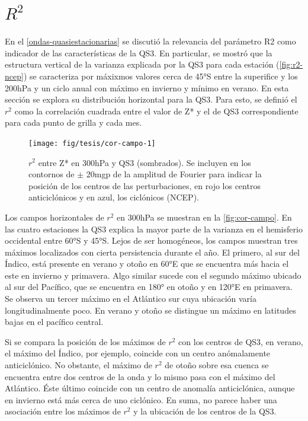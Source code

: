 \documentclass[spanish,a4paper,12pt,oneside]{book}
\begin{document}
\section{\texorpdfstring{\(R^2\)}{R\^{}2}}\label{r2}

En el \autoref{ondas-quasiestacionarias} se discutió la relevancia del
parámetro R2 como indicador de las características de la QS3. En
particular, se mostró que la estructura vertical de la varianza
explicada por la QS3 para cada estación (\autoref{fig:r2-ncep}) se
caracteriza por máxixmos valores cerca de 45°S entre la superifice y los
200hPa y un ciclo anual con máximo en invierno y mínimo en verano. En
esta sección se explora su distribución horizontal para la QS3. Para
esto, se definió el \(r^2\) como la correlación cuadrada entre el valor
de Z* y el de QS3 correspondiente para cada punto de grilla y cada mes.

\begin{figure}
\texttt{[image: fig/tesis/cor-campo-1]} \caption{$r^2$ entre Z* en 300hPa y QS3 (sombrados). Se incluyen en  los contornos de $\pm$ 20mgp de la amplitud de Fourier para indicar la posición de los centros de las perturbaciones, en rojo los centros anticiclónicos y en azul, los ciclónicos (NCEP).}\label{fig:cor-campo}
\end{figure}

Los campos horizontales de \(r^2\) en 300hPa se muestran en la
\autoref{fig:cor-campo}. En las cuatro estaciones la QS3 explica la
mayor parte de la varianza en el hemisferio occidental entre 60°S y
45°S. Lejos de ser homogéneos, los campos muestran tres máximos
localizados con cierta persistencia durante el año. El primero, al sur
del Índico, está presente en verano y otoño en 60°E que se encuentra más
hacia el este en invierno y primavera. Algo similar sucede con el
segundo máximo ubicado al sur del Pacífico, que se encuentra en 180° en
otoño y en 120°E en primavera. Se observa un tercer máximo en el
Atlántico sur cuya ubicación varía longitudinalmente poco. En verano y
otoño se distingue un máximo en latitudes bajas en el pacífico central.

Si se compara la posición de los máximos de \(r^2\) con los centros de
QS3, en verano, el máximo del Índico, por ejemplo, coincide con un
centro anómalamente anticiclónico. No obstante, el máximo de \(r^2\) de
otoño sobre esa cuenca se encuentra entre dos centros de la onda y lo
mismo pasa con el máximo del Atlántico. Éste último coincide con un
centro de anomalía anticiclónica, aunque en invierno está más cerca de
uno ciclónico. En suma, no parece haber una asociación entre los máximos
de \(r^2\) y la ubicación de los centros de la QS3.
\end{document}
